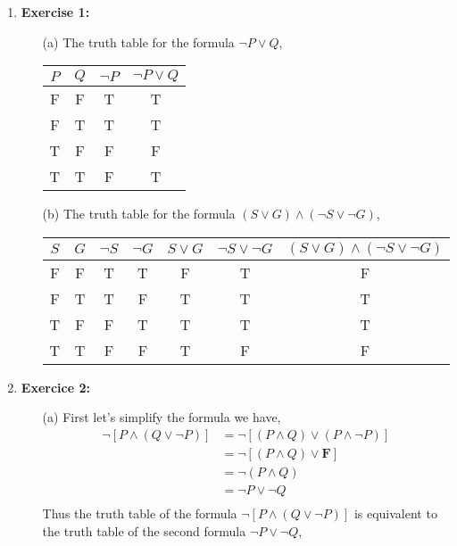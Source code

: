 \documentclass{article} %
\begin{document}
    \begin{enumerate}
        \item \textbf{Exercise 1:}
        \begin{itemize}
            \item[(a)] The truth table for the formula $\neg P \lor Q$,
            \begin{center}
            \begin{tabular}{cccc}
                $P$ & $Q$ & $\neg P$ & $\neg P \lor Q$ \\
                \hline
                F & F & T & T \\
                F & T & T & T \\
                T & F & F & F \\
                T & T & F & T \\
            \end{tabular}
            \end{center}
            \item[(b)] The truth table for the formula $(S \lor G) \land (\neg S \lor \neg G)$,
            \begin{center}
            \begin{tabular}{ccccccc}
                $S$ & $G$ & $\neg S$ & $\neg G$ & $S \lor G$ & $\neg S \lor \neg G$ & $(S \lor G) \land (\neg S \lor \neg G)$ \\
                \hline
                F & F & T & T & F & T & F \\
                F & T & T & F & T & T & T \\
                T & F & F & T & T & T & T \\
                T & T & F & F & T & F & F \\
            \end{tabular}
            \end{center}
        \end{itemize} 
        \item \textbf{Exercice 2:}
        \begin{itemize}
            \item[(a)] First let's simplify the formula we have,
            \begin{equation} 
                \begin{split}
                    \neg [P \land (Q \lor \neg P)] & = \neg [(P \land Q) \lor (P \land \neg P)] \\
                    & = \neg [(P \land Q) \lor \textbf{F}] \\
                    & = \neg (P \land Q) \\
                    & = \neg P \lor \neg Q \\
                \end{split}
            \end{equation}
            Thus the truth table of the formula $\neg [P \land (Q \lor \neg P)]$ is equivalent to the truth table of the second formula $\neg P \lor \neg Q$,


\end{itemize}
\end{enumerate}
\end{document}
